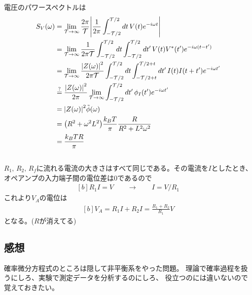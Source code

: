\documentclass[../../master.tex]{subfiles}
\begin{document}
\subsection{}
電圧のパワースペクトルは
\begin{equation}\begin{aligned}[b]
    S_V(\omega)
    &= \lim_{\mathcal{T}\to\infty}\frac{2\pi}{\mathcal{T}}\abs{\frac{1}{2\pi}\int_{-\mathcal{T}/2}^{\mathcal{T}/2}
    dt\,V(t)e^{-i\omega t}}\\
    &= \lim_{\mathcal{T}\to\infty}\frac{1}{2\pi \mathcal{T}} \int_{-\mathcal{T}/2}^{\mathcal{T}/2}dt\int_{-\mathcal{T}/2}^{\mathcal{T}/2}dt'\,
    V(t)V^*(t')e^{-i\omega(t-t')}\\
    &= \lim_{\mathcal{T}\to\infty}\frac{\abs{Z(\omega)}^2}{2\pi \mathcal{T}} \int_{-\mathcal{T}/2}^{\mathcal{T}/2}dt\int_{-\mathcal{T}/2+t}^{\mathcal{T}/2+t}dt'\,
    I(t)I(t+t')e^{-i\omega t'}\\
    &\overset{?}{=} \frac{\abs{Z(\omega)}^2}{2\pi}\lim_{\mathcal{T}\to\infty}\int_{-\mathcal{T}/2}^{\mathcal{T}/2}dt'\,\phi_I(t')e^{-i\omega t'}\\
    &= \abs{Z(\omega)}^2\tilde{\phi}(\omega)\\
    &= \qty(R^2+\omega^2 L^2)\frac{k_BT}{\pi} \frac{R}{R^2+L^2\omega^2}\\
    &= \frac{k_BT R}{\pi}
\end{aligned}\end{equation}

\subsection{}
\(R_1,\,R_2,\,R_f\)に流れる電流の大きさはすべて同じである。その電流を\(I\)としたとき、
オペアンプの入力端子間の電位差は\(0\)であるので
\begin{equation}\begin{aligned}[b]
    R_1 I = V \qquad \to \qquad I = V/R_1
\end{aligned}\end{equation}
これより\(V_A\)の電位は
\begin{equation}\begin{aligned}[b]
    V_A = R_1 I + R_2 I = \frac{R_1+R_2}{R_1}V
\end{aligned}\end{equation}
となる。(\(R\)が消えてる)

\subsection*{感想}
確率微分方程式のところは隠して非平衡系をやった問題。
理論で確率過程を扱うにしろ、実験で測定データを分析するのにしろ、
役立つのには違いないので覚えておきたい。
\end{document}
